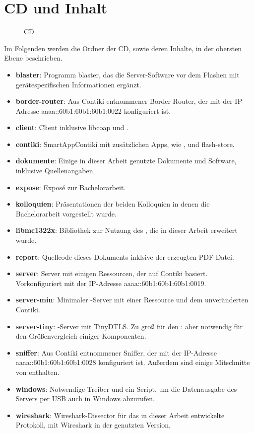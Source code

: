 \chapter{CD und Inhalt}

\begin{figure}[!ht]
\centering
{}
\caption{CD}
\label{tbl:a-cd}
\end{figure}

\clearpage

Im Folgenden werden die Ordner der CD, sowie deren Inhalte, in der obersten Ebene beschrieben.

\begin{itemize}
  \item \textbf{blaster}: Programm blaster, das die Server-Software vor dem Flashen mit gerätespezifischen Informationen ergänzt.
  \item \textbf{border-router}: Aus Contiki entnommener Border-Router, der mit der IP-Adresse aaaa::60b1:60b1:60b1:0022 konfiguriert ist.
  \item \textbf{client}: Client inklusive libcoap und .
  \item \textbf{contiki}: SmartAppContiki mit zusätzlichen Apps, wie ,  und flash-store.
  \item \textbf{dokumente}: Einige in dieser Arbeit genutzte Dokumente und Software, inklusive Quellenangaben.
  \item \textbf{expose}: Exposé zur Bachelorarbeit.
  \item \textbf{kolloquien}: Präsentationen der beiden Kolloquien in denen die Bachelorarbeit vorgestellt wurde.
  \item \textbf{libmc1322x}: Bibliothek zur Nutzung des , die in dieser Arbeit erweitert wurde.
  \item \textbf{report}: Quellcode dieses Dokuments inklsive der erzeugten PDF-Datei.
  \item \textbf{server}: Server mit einigen Ressourcen, der auf Contiki basiert. Vorkonfiguriert mit der IP-Adresse aaaa::60b1:60b1:60b1:0019.
  \item \textbf{server-min}: Minimaler -Server mit einer Ressource und dem unveränderten Contiki.
  \item \textbf{server-tiny}: -Server mit TinyDTLS. Zu groß für den : aber notwendig für den Größenvergleich einiger Komponenten.
  \item \textbf{sniffer}: Aus Contiki entnommener Sniffer, der mit der IP-Adresse aaaa::60b1:60b1:60b1:0028 konfiguriert ist. Außerdem sind einige Mitschnitte von  enthalten.
  \item \textbf{windows}: Notwendige Treiber und ein Script, um die Datenausgabe des Servers per USB auch in Windows abzurufen.
  \item \textbf{wireshark}: Wireshark-Dissector für das in dieser Arbeit entwickelte Protokoll, mit Wireshark in der genutzten Version.
\end{itemize}
